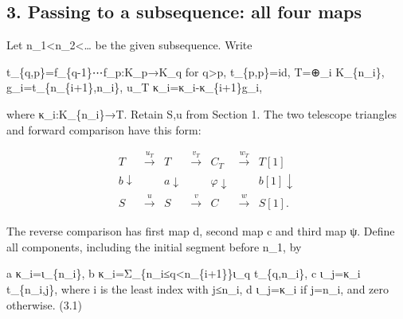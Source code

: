 \subsection{\texorpdfstring{3. Passing to a subsequence:\allowbreak{} all four maps}{3. Passing to a  all four maps}}\label{proofs-10139-10427-passing-to-a-subsequence-all-four-maps}

Let n\_\allowbreak{}1<n\_\allowbreak{}2<… be the given subsequence. Write

t\_\allowbreak{}\{q,\allowbreak{}p\}\allowbreak{}=f\_\allowbreak{}\{q-1\}⋯f\_\allowbreak{}p:\allowbreak{}K\_\allowbreak{}p\allowbreak{}→K\_\allowbreak{}q for q>p,\allowbreak{} t\_\allowbreak{}\{p,\allowbreak{}p\}\allowbreak{}=id,\allowbreak{} T\allowbreak{}=\allowbreak{}⊕\_\allowbreak{}i K\_\allowbreak{}\{n\_\allowbreak{}i\},\allowbreak{} g\_\allowbreak{}i\allowbreak{}=t\_\allowbreak{}\{n\_\allowbreak{}\{i\allowbreak{}+1\},\allowbreak{}n\_\allowbreak{}i\},\allowbreak{} u\_\allowbreak{}T κ\_\allowbreak{}i\allowbreak{}=κ\_\allowbreak{}i-κ\_\allowbreak{}\{i\allowbreak{}+1\}g\_\allowbreak{}i,\allowbreak{}

where κ\_\allowbreak{}i:\allowbreak{}K\_\allowbreak{}\{n\_\allowbreak{}i\}\allowbreak{}→T. Retain S,\allowbreak{}u from Section 1. The two telescope triangles and forward comparison have this form:\allowbreak{}

\[
\begin{array}{ccccccc}
T&\xrightarrow{u_T}&T&\xrightarrow{v_T}&C_T&\xrightarrow{w_T}&T[1]\\
\scriptstyle b\downarrow&&\scriptstyle a\downarrow&&\scriptstyle φ\downarrow&&\scriptstyle b[1]\downarrow\\
S&\xrightarrow{u}&S&\xrightarrow{v}&C&\xrightarrow{w}&S[1].
\end{array}
\]

The reverse comparison has first map d,\allowbreak{} second map c and third map ψ. Define all components,\allowbreak{} including the initial segment before n\_\allowbreak{}1,\allowbreak{} by

a κ\_\allowbreak{}i\allowbreak{}=ι\_\allowbreak{}\{n\_\allowbreak{}i\},\allowbreak{} b κ\_\allowbreak{}i\allowbreak{}=Σ\_\allowbreak{}\{n\_\allowbreak{}i≤q<n\_\allowbreak{}\{i\allowbreak{}+1\}\}ι\_\allowbreak{}q t\_\allowbreak{}\{q,\allowbreak{}n\_\allowbreak{}i\},\allowbreak{} c ι\_\allowbreak{}j\allowbreak{}=κ\_\allowbreak{}i t\_\allowbreak{}\{n\_\allowbreak{}i,\allowbreak{}j\},\allowbreak{} where i is the least index with j≤n\_\allowbreak{}i,\allowbreak{} d ι\_\allowbreak{}j\allowbreak{}=κ\_\allowbreak{}i if j\allowbreak{}=n\_\allowbreak{}i,\allowbreak{} and zero otherwise. (3.1)\allowbreak{}

